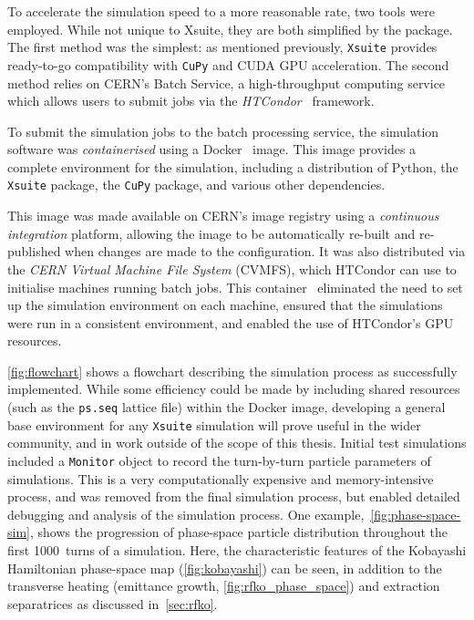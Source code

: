 \documentclass[a4paper,twoside,11pt]{report}
\begin{document}
To accelerate the simulation speed to a more reasonable rate, two tools were employed. While not unique to Xsuite, they are both simplified by the package. The first method was the simplest: as mentioned previously, \verb|Xsuite| provides ready-to-go compatibility with \verb|CuPy| and CUDA GPU acceleration. The second method relies on CERN's Batch Service, a high-throughput computing service which allows users to submit jobs via the \textit{HTCondor}~\cite{htcondor} framework. 

To submit the simulation jobs to the batch processing service, the simulation software was \textit{containerised} using a Docker~\cite{merkel2014docker} image. This image provides a complete environment for the simulation, including a distribution of Python, the \verb|Xsuite| package, the \verb|CuPy| package, and various other dependencies. 

This image was made available on CERN's image registry using a \textit{continuous integration} platform, allowing the image to be automatically re-built and re-published when changes are made to the configuration. It was also distributed via the \textit{CERN Virtual Machine File System} (CVMFS), which HTCondor can use to initialise machines running batch jobs. This container~\cite{docker} eliminated the need to set up the simulation environment on each machine, ensured that the simulations were run in a consistent environment, and enabled the use of HTCondor's GPU resources. 

\autoref{fig:flowchart} shows a flowchart describing the simulation process as successfully implemented. While some efficiency could be made by including shared resources (such as the \verb|ps.seq| lattice file) within the Docker image, developing a general base environment for any \verb|Xsuite| simulation will prove useful in the wider community, and in work outside of the scope of this thesis. Initial test simulations included a \verb|Monitor| object to record the turn-by-turn particle parameters of simulations. This is a very computationally expensive and memory-intensive process, and was removed from the final simulation process, but enabled detailed debugging and analysis of the simulation process. One example,~\autoref{fig:phase-space-sim}, shows the progression of phase-space particle distribution throughout the first \qty{1000}{turns} of a simulation. Here, the characteristic features of the Kobayashi Hamiltonian phase-space map (\autoref{fig:kobayashi}) can be seen, in addition to the transverse heating (emittance growth, \autoref{fig:rfko_phase_space}) and extraction separatrices as discussed in~\autoref{sec:rfko}.
\end{document}
